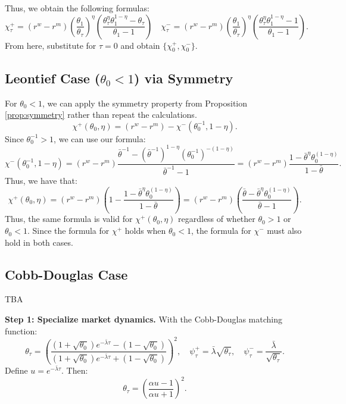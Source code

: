 Thus, we obtain the following formulas:
\begin{equation*}
\chi_\tau^+ = (r^w - r^m)\left(\frac{\theta_1}{\theta_\tau}\right)^{\eta} \left(\frac{\theta_\tau^{\eta}\theta_1^{1-\eta} - \theta_\tau}{\theta_1 - 1}\right)\quad
\chi_\tau^- = (r^w - r^m)\left(\frac{\theta_1}{\theta_\tau}\right)^{\eta} \left(\frac{\theta_\tau^{\eta}\theta_1^{1-\eta} - 1}{\theta_1 - 1}\right).
\end{equation*}
From here, substitute for $\tau = 0$ and obtain $\{\chi_0^+, \chi_0^-\}$.

\subsection{Leontief Case ($\theta_0 < 1$) via Symmetry}

For $\theta_0 < 1$, we can apply the symmetry property from Proposition \ref{prop:symmetry} rather than repeat the calculations.
\[
\chi^{+}(\theta_0, \eta) = (r^{w}-r^{m}) - \chi^{-}(\theta_0^{-1}, 1-\eta).
\]
Since $\theta_0^{-1} > 1$, we can use our formula:
\[
\chi^{-}(\theta_0^{-1}, 1-\eta) = (r^{w}-r^{m})\frac{\bar{\theta}^{-1} - (\bar{\theta}^{-1})^{1-\eta}(\theta_0^{-1})^{-(1-\eta)}}{\bar{\theta}^{-1}-1}=(r^{w}-r^{m})\frac{1 - \bar{\theta}^{\eta}\theta_0^{(1-\eta)}}{1-\bar{\theta}}.
\]
Thus, we have that:
\[
\chi^{+}(\theta_0, \eta) = (r^{w}-r^{m})\left(1-\frac{1 - \bar{\theta}^{\eta}\theta_0^{(1-\eta)}}{1-\bar{\theta}}\right)=(r^{w}-r^{m})\left(\frac{\bar{\theta} - \bar{\theta}^{\eta}\theta_0^{(1-\eta)}}{\bar{\theta}-1}\right).
\]
Thus, the same formula is valid for $\chi^{+}(\theta_0, \eta)$ regardless of whether $\theta_0>1$ or $\theta_0<1.$ Since the formula for $\chi^{+}$ holds when $\theta_0<1$, the formula for $\chi^{-}$ must also hold in both cases. 

\subsection{Cobb-Douglas Case}
{\color{red}
TBA
}

\textbf{Step 1: Specialize market dynamics.} With the Cobb-Douglas matching function:
\[
\theta_{\tau} = \left(\frac{(1+\sqrt{\theta_0})e^{-\bar{\lambda}\tau} - (1-\sqrt{\theta_0})}{(1+\sqrt{\theta_0})e^{-\bar{\lambda}\tau} + (1-\sqrt{\theta_0})}\right)^2,\quad
\psi^+_{\tau} = \bar{\lambda}\sqrt{\theta_{\tau}},\quad
\psi^-_{\tau} = \frac{\bar{\lambda}}{\sqrt{\theta_{\tau}}}.
\]
Define $u = e^{-\bar{\lambda}\tau}$. Then:
\[
\theta_\tau = \left(\frac{\alpha u - 1}{\alpha u + 1}\right)^2.
\]


